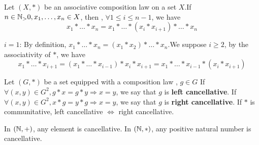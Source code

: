 \begin{propositionenv}
    Let $(X, *)$ be an associative composition law on a set $X$.If $n\in \mathbb{N}_>0, x_1, \dots, x_n\in X$,  then ,  $\forall 1\le i\le n-1$,  we have 
    $$x_1*\dots *x_n=x_1*\dots *(x_i*x_{i+1})*\dots *x_n$$
\end{propositionenv}
\begin{proofenv}
    \quad
    \newline
    $i=1$: By definition, $x_1*\dots *x_n=(x_1*x_2)*\dots *x_n$.We suppose $i\geq 2 $,  by the associativity of $*$,  we have
    $$x_1*\dots *x_{i+1}=(x_1*\dots *x_{i-1})*x_i*x_{i+1}=x_1*\dots *x_{i-1}*(x_i*x_{i+1})$$ 
\end{proofenv}
\begin{definitionenv}
    Let $(G, *)$ be a set equipped with a composition law ,  $g\in G$
    \newline
    If $\forall (x, y)\in G^2, g*x=g*y\Rightarrow x=y$, we say that $g$ is \textbf{left cancellative}.
    \newline
    If $\forall (x, y)\in G^2, x*g=y*g\Rightarrow x=y$, we say that $g$ is \textbf{right cancellative}.
    \newline
    If $*$ is communitative,  left cancellative $\Leftrightarrow$ right cancellative.
\end{definitionenv}
\begin{exampleenv}
    \quad
    \newline
    In $(\mathbb{N}, +)$,  any element is cancellative.
    \newline
    In $(\mathbb{N}, *)$,  any positive natural number is cancellative.

\end{exampleenv}
